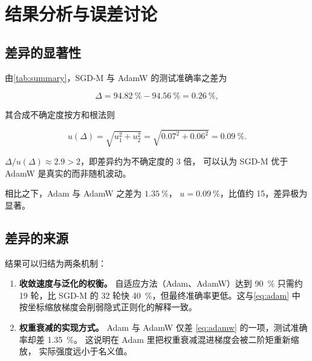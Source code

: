 \section{结果分析与误差讨论}
\label{sec:analysis}

\subsection{差异的显著性}
\label{sec:analysis:significance}

由\cref{tab:summary}，SGD-M 与 AdamW 的测试准确率之差为

\begin{equation}
  \label{eq:diff}
  \Delta = \qty{94.82}{\percent} - \qty{94.56}{\percent} = \qty{0.26}{\percent},
\end{equation}

其合成不确定度按方和根法则

\begin{equation}
  \label{eq:combined-u}
  u(\Delta) = \sqrt{u_1^2 + u_2^2}
    = \sqrt{0.07^2 + 0.06^2} = \qty{0.09}{\percent}.
\end{equation}

$\Delta / u(\Delta) \approx 2.9 > 2$，即差异约为不确定度的 3 倍，
可以认为 SGD-M 优于 AdamW 是真实的而非随机波动。

相比之下，Adam 与 AdamW 之差为 $\qty{1.35}{\percent}$，
$u = \qty{0.09}{\percent}$，比值约 15，差异极为显著。

\subsection{差异的来源}
\label{sec:analysis:mechanism}

结果可以归结为两条机制：

\begin{enumerate}
  \item \textbf{收敛速度与泛化的权衡。} 自适应方法（Adam、AdamW）达到
        \qty{90}{\percent} 只需约 19 轮，比 SGD-M 的 32 轮快
        \qty{40}{\percent}，但最终准确率更低。这与\cref{eq:adam} 中
        按坐标缩放梯度会削弱隐式正则化的解释一致。

  \item \textbf{权重衰减的实现方式。} Adam 与 AdamW 仅差
        \cref{eq:adamw} 的一项，测试准确率却差 \qty{1.35}{\percent}。
        这说明在 Adam 里把权重衰减混进梯度会被二阶矩重新缩放，
        实际强度远小于名义值\cite{loshchilov2019adamw}。
\end{enumerate}

